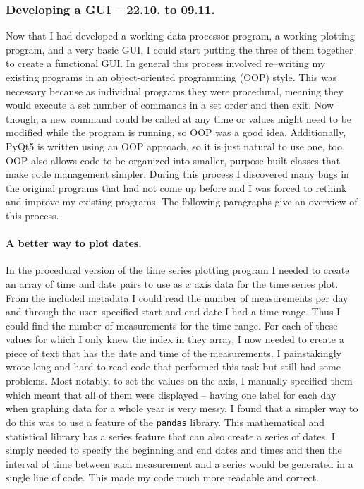 \documentclass[../00_main.tex]{subfiles}
\begin{document}
\subsubsection{Developing a GUI -- 22.10. to 09.11.}

Now that I had developed a working data processor program, a working
plotting program, and a very basic GUI, I could start putting the three of them
together to create a functional GUI. In general this process involved
re--writing my existing programs in an object-oriented programming (OOP) style. This was
necessary because as individual programs they were procedural, meaning they
would execute a set number of commands in a set order and then exit. Now 
though, a new command
could be called at any time or values might need to be modified while the
program is running, so OOP was a good idea. Additionally, PyQt5 is written
using an OOP approach, so it is just natural to use one, too. OOP also allows
code to be organized into smaller, purpose-built classes that make code
management simpler. During this process I discovered many bugs in the original
programs that had not come up before and I was forced to rethink and improve my
existing programs. The following paragraphs give an overview of this process.

\paragraph{A better way to plot dates.} In the procedural version of the time
series plotting program I needed to create an array of time and date pairs to
use as $x$ axis data for the time series plot. From the included metadata
I could read the number of measurements per day and through the user--specified
start and end date I had a time range. Thus I could find the number of
measurements for the time range. For each of these values for which I only knew
the index in they array, I now needed to create a piece of text that has the
date and time of the measurements. I painstakingly wrote long and hard-to-read
code that performed this task but still had some problems. Most notably, to set
the values on the axis, I manually specified them which meant that all of them
were displayed -- having one label for each day when graphing data for a whole 
year is very messy. I found that a simpler way to do this was to use a feature
of the \texttt{pandas} library. This mathematical and statistical library has
a series feature that can also create a series of dates. I simply needed to
specify the beginning and end dates and times and then the interval of time
between each measurement and a series would be generated in a single line of
code. This made my code much more readable and correct. 
\end{document}
